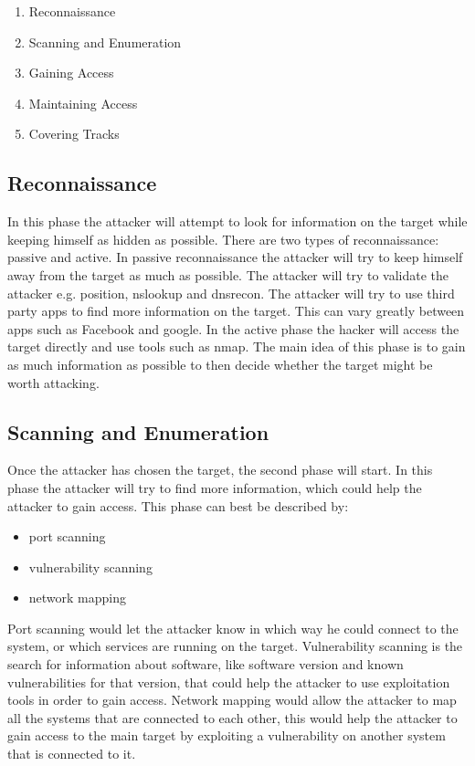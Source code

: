 \documentclass{article}%
\begin{document}
\begin{enumerate}
  \item Reconnaissance
  \item Scanning and Enumeration
  \item Gaining Access
  \item Maintaining Access
  \item Covering Tracks
\end{enumerate}
\subsection{Reconnaissance}
In this phase the attacker will attempt to look for information on the target while keeping himself as hidden as possible. There are two types of reconnaissance: passive and active. In passive reconnaissance the attacker will try to keep himself away from the target as much as possible. The attacker will try to validate the attacker e.g. position, nslookup and dnsrecon. The attacker will try to use third party apps to find more information on the target. This can vary greatly between apps such as Facebook and google. In the active phase the hacker will access the target directly and use tools such as nmap. The main idea of this phase is to gain as much information as possible to then decide whether the target might be worth attacking.
\subsection{Scanning and Enumeration}
Once the attacker has chosen the target, the second phase will start. In this phase the attacker will try to find more information, which could help the attacker to gain access. This phase can best be described by:
\begin{itemize}
	\item port scanning
	\item vulnerability scanning
	\item network mapping
\end{itemize}
Port scanning would let the attacker know in which way he could connect to the system, or which services are running on the target.
Vulnerability scanning is the search for information about software, like software version and known vulnerabilities for that version, that could help the attacker to use exploitation tools in order to gain access.
Network mapping would allow the attacker to map all the systems that are connected to each other, this would help the attacker to gain access to the main target by exploiting a vulnerability on another system that is connected to it.
\end{document}
